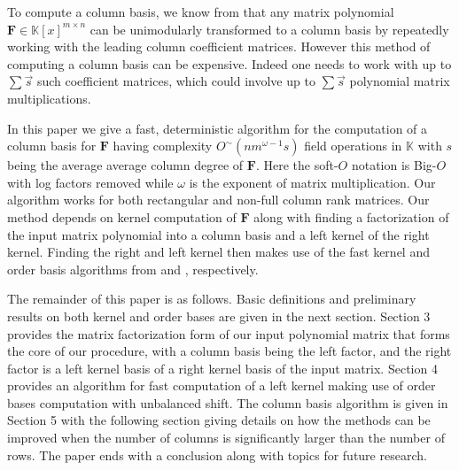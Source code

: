 To compute a column basis, we know from \cite{BL1997} that any matrix
polynomial $\mathbf{F}\in\mathbb{K}\left[x\right]^{m\times n}$ can
be unimodularly transformed to a column basis by repeatedly working
with the leading column coefficient matrices. However this method
of computing a column basis can be expensive. Indeed one needs to
work with up to $\sum\vec{s}$ such coefficient matrices, which could
involve up to $\sum\vec{s}$ polynomial matrix multiplications.

In this paper we give a fast, deterministic algorithm for the computation
of a column basis for $\mathbf{F}$ having complexity $O^{\sim}\left(nm^{\omega-1}s\right)$
field operations in $\mathbb{K}$ with $s$ being the average average
column degree of $\mathbf{F}$. Here the soft-$O$ notation is Big-$O$
with log factors removed while $\omega$ is the exponent of matrix
multiplication. Our algorithm works for both rectangular and non-full
column rank matrices. Our method depends on kernel computation
of $\mathbf{F}$ along with finding a factorization of the input matrix
polynomial into a column basis and a left kernel of the right kernel.
Finding the right and left kernel then makes use of the fast kernel
and order basis algorithms from \cite{za2012} and \cite{za2009},
respectively.

The remainder of this paper is as follows. Basic definitions and preliminary
results on both kernel and order bases are given in the next section.
Section 3 provides the matrix factorization form of our input polynomial
matrix that forms the core of our procedure, with a column basis being
the left factor, and the right factor is a left kernel basis of a
right kernel basis of the input matrix. Section 4 provides an algorithm
for fast computation of a left kernel making use of order bases computation
with unbalanced shift. The column basis algorithm is given in Section
5 with the following section giving details on how the methods can
be improved when the number of columns is significantly larger than
the number of rows.  The paper ends with a conclusion along with
topics for future research.
